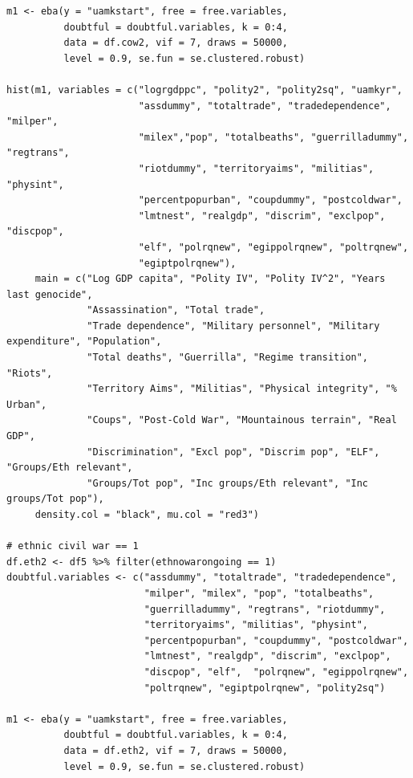 \begin{verbatim}
m1 <- eba(y = "uamkstart", free = free.variables,
          doubtful = doubtful.variables, k = 0:4,
          data = df.cow2, vif = 7, draws = 50000,
          level = 0.9, se.fun = se.clustered.robust)

hist(m1, variables = c("logrgdppc", "polity2", "polity2sq", "uamkyr",
                       "assdummy", "totaltrade", "tradedependence", "milper",
                       "milex","pop", "totalbeaths", "guerrilladummy", "regtrans",
                       "riotdummy", "territoryaims", "militias", "physint",
                       "percentpopurban", "coupdummy", "postcoldwar",
                       "lmtnest", "realgdp", "discrim", "exclpop", "discpop",
                       "elf", "polrqnew", "egippolrqnew", "poltrqnew",
                       "egiptpolrqnew"),
     main = c("Log GDP capita", "Polity IV", "Polity IV^2", "Years last genocide",
              "Assassination", "Total trade", 
              "Trade dependence", "Military personnel", "Military expenditure", "Population", 
              "Total deaths", "Guerrilla", "Regime transition", "Riots",
              "Territory Aims", "Militias", "Physical integrity", "% Urban",
              "Coups", "Post-Cold War", "Mountainous terrain", "Real GDP",
              "Discrimination", "Excl pop", "Discrim pop", "ELF", "Groups/Eth relevant", 
              "Groups/Tot pop", "Inc groups/Eth relevant", "Inc groups/Tot pop"),
     density.col = "black", mu.col = "red3")
     
# ethnic civil war == 1
df.eth2 <- df5 %>% filter(ethnowarongoing == 1)
doubtful.variables <- c("assdummy", "totaltrade", "tradedependence",
                        "milper", "milex", "pop", "totalbeaths",
                        "guerrilladummy", "regtrans", "riotdummy",
                        "territoryaims", "militias", "physint",
                        "percentpopurban", "coupdummy", "postcoldwar",
                        "lmtnest", "realgdp", "discrim", "exclpop", 
                        "discpop", "elf",  "polrqnew", "egippolrqnew",
                        "poltrqnew", "egiptpolrqnew", "polity2sq")

m1 <- eba(y = "uamkstart", free = free.variables,
          doubtful = doubtful.variables, k = 0:4,
          data = df.eth2, vif = 7, draws = 50000,
          level = 0.9, se.fun = se.clustered.robust)


\end{verbatim}

